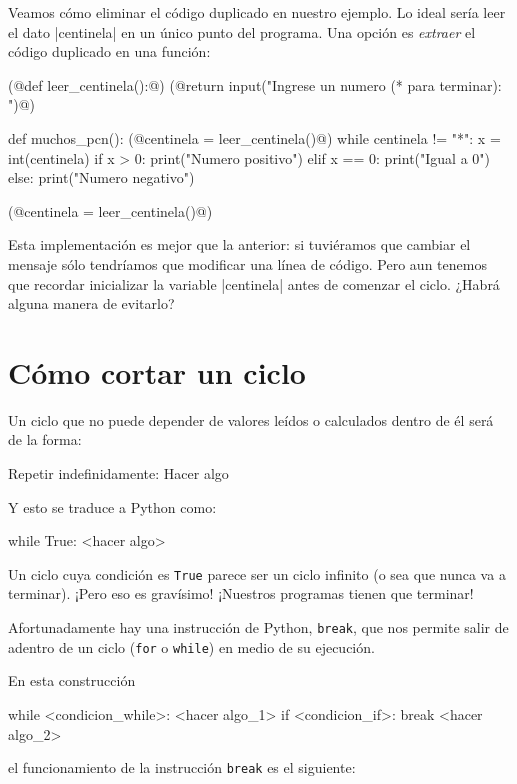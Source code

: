 Veamos cómo eliminar el código duplicado en nuestro ejemplo.
Lo ideal sería leer el dato |centinela| en un único punto del
programa. Una opción es \emph{extraer} el código duplicado en una función:

\begin{codigo-python-sn}
(@def leer_centinela():@)
    (@return input("Ingrese un numero (* para terminar): ")@)

def muchos_pcn():
    (@centinela = leer_centinela()@)
    while centinela != "*":
        x = int(centinela)
        if x > 0:
            print("Numero positivo")
        elif x == 0:
            print("Igual a 0")
        else:
            print("Numero negativo")

        (@centinela = leer_centinela()@)
\end{codigo-python-sn}

Esta implementación es mejor que la anterior: si tuviéramos que cambiar el
mensaje sólo tendríamos que modificar una línea de código. Pero aun tenemos que
recordar inicializar la variable |centinela| antes de comenzar el ciclo. ¿Habrá
alguna manera de evitarlo?

\section{Cómo cortar un ciclo}

Un ciclo que no puede depender de valores leídos o calculados dentro
de él será de la forma:

\begin{codigo-nohl-sn}
Repetir indefinidamente:
    Hacer algo
\end{codigo-nohl-sn}

Y esto se traduce a Python como:

\begin{codigo-python-sn}
while True:
    <hacer algo>
\end{codigo-python-sn}

Un ciclo cuya condición es \lstinline!True! parece ser un ciclo infinito (o
sea que nunca va a terminar). ¡Pero eso es gravísimo! ¡Nuestros programas
tienen que terminar!

Afortunadamente hay una instrucción de Python, \lstinline!break!, que nos
permite salir de adentro de un ciclo (\lstinline!for! o
\lstinline!while!) en medio de su ejecución.

En esta construcción
\begin{codigo-python-sn}
while <condicion_while>:
    <hacer algo_1>
    if <condicion_if>:
        break
    <hacer algo_2>
\end{codigo-python-sn}
el funcionamiento de la instrucción \lstinline!break! es el siguiente:


